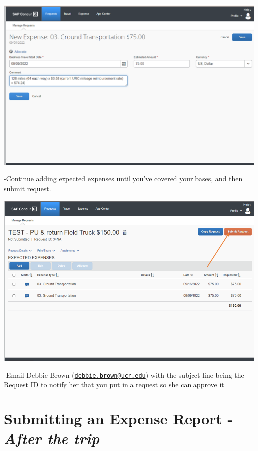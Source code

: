 \documentclass[
]{book}
\begin{document}
\begin{flushleft}\includegraphics{images/concur5} \end{flushleft}

-Continue adding expected expenses until you've covered your bases, and then submit request.

\begin{flushleft}\includegraphics{images/concur6} \end{flushleft}

-Email Debbie Brown (\href{mailto:debbie.brown@ucr.edu}{\nolinkurl{debbie.brown@ucr.edu}}) with the subject line being the Request ID to notify her that you put in a request so she can approve it

\hypertarget{submitting-an-expense-report---after-the-trip}{%
\section{\texorpdfstring{Submitting an Expense Report - \emph{After the trip}}{Submitting an Expense Report - After the trip}}\label{submitting-an-expense-report---after-the-trip}}
\end{document}

